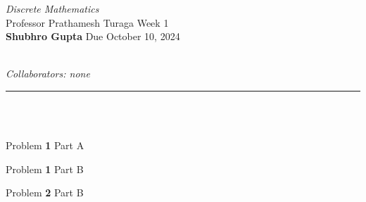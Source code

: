 \documentclass[11pt]{article}
\newcommand{\problem
}[2]{
\begin{mdframed}
    Problem \textbf{#1} \hfill #2
\end{mdframed}
}
\newcommand{\heading}[5]{
\begin{large}
\noindent\emph{#1}\smallskip ~\\
Professor #3 \hfill Week #2 \smallskip ~\\
\textbf{Shubhro Gupta} \hfill Due #4 ~\\
\end{large} \medskip ~\\
{\emph{Collaborators: #5}}~\\
\hrule
\vspace{50pt}
~\\
}
\begin{document}
\heading{Discrete Mathematics}{1}{Prathamesh Turaga}{October 10, 2024}{none}
\\
\problem{1}{Part A}
\problem{1}{Part B}
\problem{2}{Part B}
\end{document}
